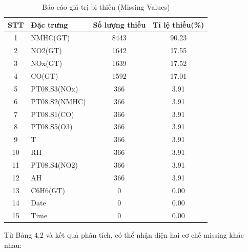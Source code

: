 \documentclass[12pt,a4paper]{report}
\newcommand{\theadcolor}{\rowcolor{tableheader}}
\begin{document}
\begin{center}
\begin{table}[H]
\centering
\caption{Báo cáo giá trị bị thiếu (Missing Values)}
\label{table:missing_values}
\begin{tabular}{|c|l|c|c|}
\hline
\theadcolor \textbf{STT} & \textbf{Đặc trưng} & \textbf{Số lượng thiếu} & \textbf{Tỉ lệ thiếu(\%)} \\
\hline
1 & NMHC(GT) & 8443 & 90.23 \\
\hline
2 & NO2(GT) & 1642 & 17.55 \\
\hline
3 & NOx(GT) & 1639 & 17.52 \\
\hline
4 & CO(GT) & 1592 & 17.01 \\
\hline
5 & PT08.S3(NOx) & 366 & 3.91 \\
\hline
6 & PT08.S2(NMHC) & 366 & 3.91 \\
\hline
7 & PT08.S1(CO) & 366 & 3.91 \\
\hline
8 & PT08.S5(O3) & 366 & 3.91 \\
\hline
9 & T & 366 & 3.91 \\
\hline
10 & RH & 366 & 3.91 \\
\hline
11 & PT08.S4(NO2) & 366 & 3.91 \\
\hline
12 & AH & 366 & 3.91 \\
\hline
13 & C6H6(GT) & 0 & 0.00 \\
\hline
14 & Date & 0 & 0.00 \\
\hline
15 & Time & 0 & 0.00 \\
\hline
\end{tabular}
\end{table}
\end{center}

Từ Bảng 4.2 và kết quả phân tích, có thể nhận diện hai cơ chế missing khác nhau:
\end{document}
